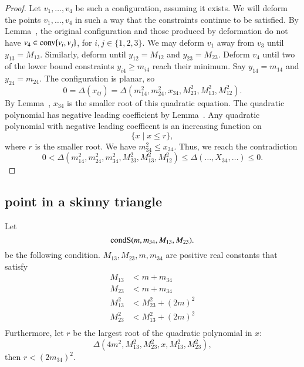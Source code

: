 \begin{proof}
	Let $v_1,\ldots,v_4$ be such a configuration, assuming it exists.  
We will deform the points $v_1,\ldots,v_4$ in such a way that the constraints continue
to be satisfied.  By Lemma~,
the original configuration and those produced by deformation do not have
	$v_4\in{\operatorname{conv}}\{v_i,v_j\}$, for $i,j\in\{1,2,3\}$.
We may deform $v_1$ away from $v_3$ until $y_{13}=M_{13}$.  Similarly,
deform until $y_{12}=M_{12}$ and $y_{23}=M_{23}$.    Deform $v_4$ until two of the
lower bound constraints $y_{i4}\ge m_{i4}$ reach their minimum. 
Say $y_{14}=m_{14}$ and $y_{24}=m_{24}$.
The configuration is planar, so
	$$
	0=\Delta(x_{ij}) = \Delta(m_{14}^2,m_{24}^2,x_{34},M_{23}^2,M_{13}^2,M_{12}^2).
	$$
By Lemma~, $x_{34}$ is the smaller root of this quadratic equation.
The quadratic polynomial has negative leading coefficient by Lemma~.
Any quadratic polynomial with negative leading coefficent is an increasing function on
	$$\{x \mid x \le r\},$$ where $r$ is the smaller root.
We have $m_{34}^2\le x_{34}$. Thus, we reach the contradiction
	$$0<\Delta(m_{14}^2,m_{24}^2,m_{34}^2,M_{23}^2,M_{13}^2,M_{12}^2)
        \le \Delta(\ldots,X_{34},\ldots)\le 0.$$
\end{proof}

\newpage

\subsection{point in a skinny triangle}

\begin{definition}[$\condskinny$]
Let 
	$$
	{\operatorname{condS}}(m,m_{34},M_{13},M_{23}). 
	$$
be the following condition.
 $M_{13},M_{23},m,m_{34}$ are positive real constants
that satisfy 
	$$
	\begin{array}{rll}
		M_{13} &< m + m_{34}\\
		M_{23} &< m + m_{34}\\
		M_{13}^2 &< M_{23}^2 + (2m)^2\\
		M_{23}^2 &< M_{13}^2 + (2m)^2\\
	\end{array}
	$$
Furthermore, let $r$ be the largest root of the quadratic polynomial in $x$:
	$$\Delta(4m^2,M_{13}^2,M_{23}^2,x,M_{13}^2,M_{23}^2),$$
then $r < (2 m_{34})^2$.
\end{definition}


